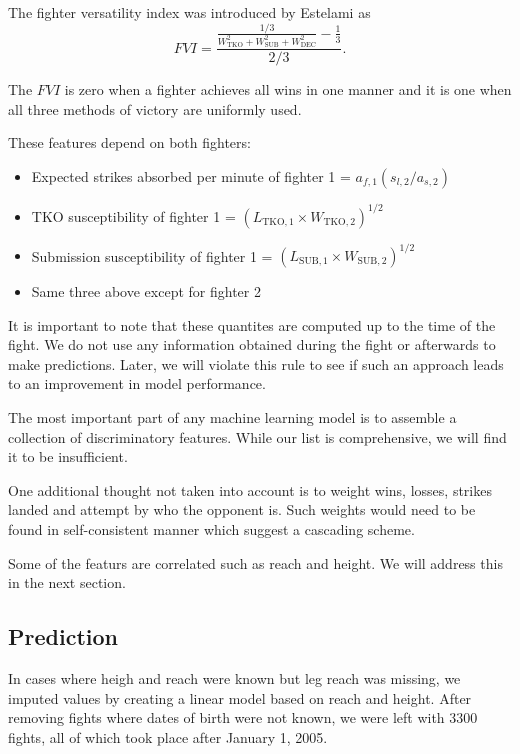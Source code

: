 \noindent
The fighter versatility index was introduced by Estelami as
\begin{equation}
FVI = \frac{\frac{1/3}{W_{\textrm{TKO}}^2+W_{\textrm{SUB}}^2+W_{\textrm{DEC}}^2}-\frac{1}{3}}{2/3}.
\end{equation}

The $FVI$ is zero when a fighter achieves all wins in one manner and
it is one when all three methods of victory are uniformly used.

\noindent
These features depend on both fighters:

\begin{itemize}[noitemsep]
  \item Expected strikes absorbed per minute of fighter 1 = $a_{f,1} (s_{l,2}/a_{s,2})$
  \item TKO susceptibility of fighter 1 = $(L_{\textrm{TKO},1} \times W_{\textrm{TKO},2})^{1/2}$
  \item Submission susceptibility of fighter 1 = $(L_{\textrm{SUB},1} \times W_{\textrm{SUB},2})^{1/2}$
  \item Same three above except for fighter 2
\end{itemize}

It is important to note that these quantites are computed
up to the time of the fight. We do not use any information
obtained during the fight or afterwards to make predictions.
Later, we will violate this rule to see if such an approach
leads to an improvement in model performance.

The most important part of any machine learning model is
to assemble a collection of discriminatory features. While
our list is comprehensive, we will find it to be insufficient.

One additional thought not taken into account is to weight
wins, losses, strikes landed and attempt by who the opponent
is. Such weights would need to be found in self-consistent
manner which suggest a cascading scheme.

Some of the featurs are correlated such as reach
and height. We will address this in the next section.


\subsection*{Prediction}

In cases where heigh and reach were known but leg reach
was missing, we imputed values by creating a linear model
based on reach and height. After removing fights where
dates of birth were not known, we were left with 3300 fights,
all of which took place after January 1, 2005.

